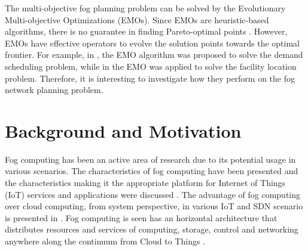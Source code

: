 \documentclass[10pt,journal,compsoc]{IEEEtran}
\begin{document}
The multi-objective fog planning problem can be solved by the Evolutionary Multi-objective Optimizations (EMOs)\cite{Deb:2002:FEM:2221359.2221582,smpso}. Since EMOs are heuristic-based algorithms, there is no guarantee in finding Pareto-optimal points \cite{Deb:2001:MOU:559152}. However, EMOs have effective operators to evolve the solution points towards the optimal frontier. For example, in \cite{ITOR:ITOR12294}, the EMO algorithm was proposed to solve the demand scheduling problem, while in \cite{HARRIS20141} the EMO was applied to solve the facility location problem. Therefore, it is interesting to investigate how they perform on the fog network planning problem.
\fi
\iffalse
\section{Background and Motivation}
Fog computing has been an active area of research due to its potential usage in various scenarios. The characteristics of fog computing have been presented and the characteristics making it the appropriate platform for Internet of Things (IoT) services and applications were discussed \cite{Bonomi:2012:FCR:2342509.2342513, momentum}. The advantage of fog computing over cloud computing, from system perspective, in various IoT and SDN scenario is presented in \cite{fcp}. Fog computing is seen has an horizontal architecture that distributes resources and services of computing, storage, control and networking anywhere along the continuum from Cloud to Things \cite{openfog}. %
\end{document}
